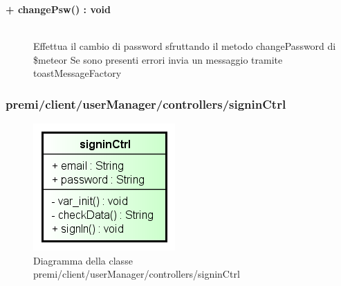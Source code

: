 \begin{description}
	\begin{description}
		\item[\textbf{\color{blue}+ changePsw() : void			}] \hfill \\
			Effettua il cambio di password sfruttando il metodo changePassword di \$meteor
			Se sono presenti errori invia un messaggio tramite toastMessageFactory
	\end{description}

\end{description}






\subsubsection{premi/client/userManager/controllers/signinCtrl}
\begin{figure}[h]
\begin{center}
\includegraphics[scale=0.55]{img/diacla/signinCtrl.png}
\caption{Diagramma della classe premi/client/userManager/controllers/signinCtrl}
\end{center}
\end{figure}


